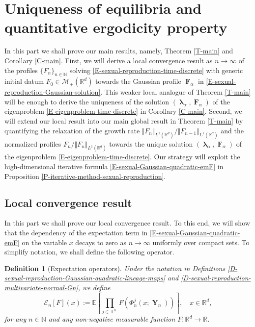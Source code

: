 \documentclass[reqno]{amsart}
\newtheorem{definition}{Definition}[section]
\DeclareMathOperator{\Leaves}{\mathsf{L}}
\DeclareMathOperator{\blambda}{\boldsymbol{\lambda}}
\DeclareMathOperator{\bF}{\boldsymbol{F}}
\DeclareMathOperator{\bY}{\mathbf{Y}}
\numberwithin{equation}{section}
\begin{document}
{\section{Uniqueness of equilibria and quantitative ergodicity property}\label{S-ergodicity}
In this part we shall prove our main results, namely, Theorem \ref{T-main} and Corollary \ref{C-main}. First, we will derive a local convergence result as $n\rightarrow\infty$ of the profiles $\{F_n\}_{n\in \mathbb{N}}$ solving \eqref{E-sexual-reproduction-time-discrete} with generic initial datum $F_0\in \mathcal{M}_+(\mathbb{R}^d)$ towards the Gaussian profile $\bF_\alpha$ in \eqref{E-sexual-reproduction-Gaussian-solution}. This weaker local analogue of Theorem \ref{T-main} will be enough to derive the uniqueness of the solution $(\blambda_\alpha,\bF_\alpha)$ of the eigenproblem \eqref{E-eigenproblem-time-discrete} in Corollary \ref{C-main}. Second, we will extend our local result into our main global result in Theorem \ref{T-main} by quantifying the relaxation of the growth rate $\Vert F_n\Vert_{L^1(\mathbb{R}^d)}/\Vert F_{n-1}\Vert_{L^1(\mathbb{R}^d)}$ and the normalized profiles $F_n/\Vert F_n\Vert_{L^1(\mathbb{R}^d)}$ towards the unique solution $(\blambda_\alpha,\bF_\alpha)$ of the eigenproblem \eqref{E-eigenproblem-time-discrete}. Our strategy will exploit the high-dimensional iterative formula \eqref{E-sexual-Gaussian-quadratic-emF} in Proposition \ref{P-iterative-method-sexual-reproduction}.

\subsection{Local convergence result}

In this part we shall prove our local convergence result. To this end, we will show that the dependency of the expectation term in \eqref{E-sexual-Gaussian-quadratic-emF} on the variable $x$ decays to zero as $n\rightarrow\infty$ uniformly over compact sets. To simplify notation, we shall define the following operator.

\begin{definition}[Expectation operators]\label{D-expectation-operator}
Under the notation in Definitions \ref{D-sexual-reproduction-Gaussian-quadratic-lineage-maps} and \ref{D-sexual-reproduction-multivariate-normal-Gn}, we define
\begin{equation}\label{E-expectation-operator}
\mathcal{E}_n[F](x):=\mathbb{E}\left[\prod_{j\in \Leaves^n}F(\Phi^j_n(x;\bY_n))\right],\quad x\in \mathbb{R}^d,
\end{equation}
for any $n\in \mathbb{N}$ and any non-negative measurable function $F:\mathbb{R}^d\rightarrow \mathbb{R}$.
\end{definition}

}
\end{document}
